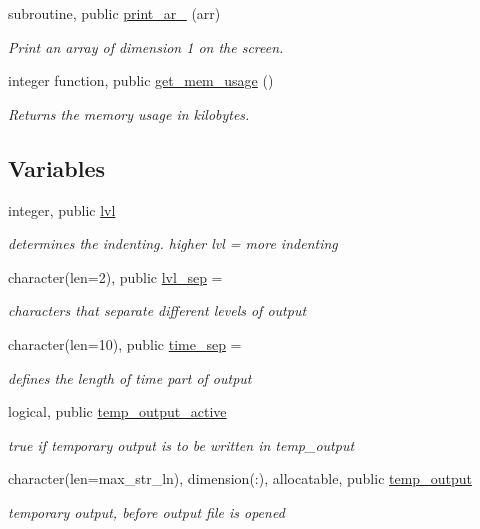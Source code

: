 \begin{DoxyCompactItemize}
subroutine, public \hyperlink{namespacemessages_a5686118397930f505259225f3688216b}{print\+\_\+ar\+\_} (arr)
\begin{DoxyCompactList}\small\item\em Print an array of dimension 1 on the screen. \end{DoxyCompactList}\item 
integer function, public \hyperlink{namespacemessages_a82dddaab795b78b3d39e1ff1aab2f665}{get\+\_\+mem\+\_\+usage} ()
\begin{DoxyCompactList}\small\item\em Returns the memory usage in kilobytes. \end{DoxyCompactList}\end{DoxyCompactItemize}
\subsection*{Variables}
\begin{DoxyCompactItemize}
\item 
integer, public \hyperlink{namespacemessages_a36521a46e57da1d3be83019abdff132e}{lvl}
\begin{DoxyCompactList}\small\item\em determines the indenting. higher {\ttfamily lvl} = more indenting \end{DoxyCompactList}\item 
character(len=2), public \hyperlink{namespacemessages_ab1101c3acf2edc71877d4aa71aa3d931}{lvl\+\_\+sep} = \textquotesingle{}\textquotesingle{}
\begin{DoxyCompactList}\small\item\em characters that separate different levels of output \end{DoxyCompactList}\item 
character(len=10), public \hyperlink{namespacemessages_abeb2abf0ac1d1fb4f09d881eb57b3dae}{time\+\_\+sep} = \textquotesingle{}\textquotesingle{}
\begin{DoxyCompactList}\small\item\em defines the length of time part of output \end{DoxyCompactList}\item 
logical, public \hyperlink{namespacemessages_ace8877914cfa5253cc002da0f387446a}{temp\+\_\+output\+\_\+active}
\begin{DoxyCompactList}\small\item\em true if temporary output is to be written in {\ttfamily temp\+\_\+output} \end{DoxyCompactList}\item 
character(len=max\+\_\+str\+\_\+ln), dimension(\+:), allocatable, public \hyperlink{namespacemessages_a07070e72f15146af24816c39eea17088}{temp\+\_\+output}
\begin{DoxyCompactList}\small\item\em temporary output, before output file is opened \end{DoxyCompactList}\end{DoxyCompactItemize}


